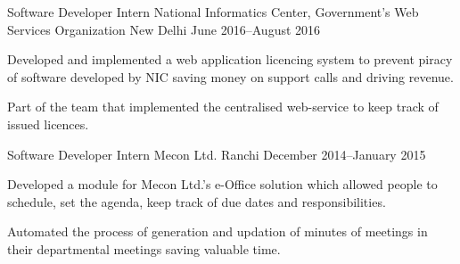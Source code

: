 
\begin{cventries}

\cventry%
  {Software Developer Intern} %
  {National Informatics Center, Government's Web Services Organization} %
  {New Delhi} %
  {June 2016--August 2016} %
  {%
    \begin{cvitems} %
      \item{Developed and implemented a web application licencing system to
            prevent piracy of software developed by NIC saving money on support
            calls and driving revenue.}
      \item{Part of the team that implemented the centralised web-service to
            keep track of issued licences.}
    \end{cvitems}
  }

\cventry%
  {Software Developer Intern} %
  {Mecon Ltd.} %
  {Ranchi} %
  {December 2014--January 2015} %
  {%
    \begin{cvitems} %
      \item{Developed a module for Mecon Ltd.'s e-Office solution which allowed
            people to schedule, set the agenda, keep track of due dates and
            responsibilities.}
      \item{Automated the process of generation and updation of minutes of
            meetings in their departmental meetings saving valuable time.}
    \end{cvitems}
  }

\end{cventries}
